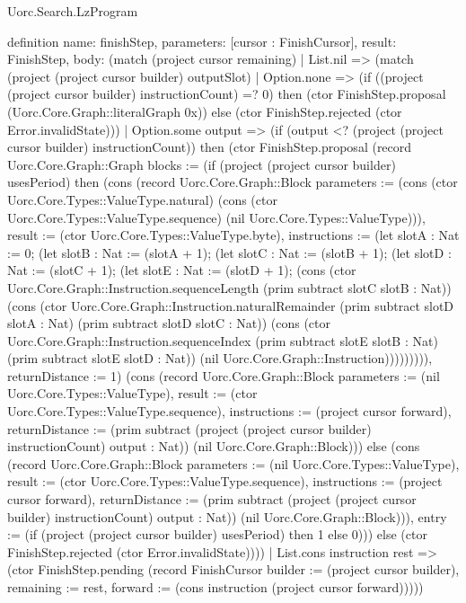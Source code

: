\begin{lexlean}{Uorc.Search.LzProgram}
\begin{semanticmodule}
definition{
  name: finishStep,
  parameters: [cursor : FinishCursor],
  result: FinishStep,
  body: (match (project cursor remaining)
    | List.nil => (match (project (project cursor builder) outputSlot)
      | Option.none => (if ((project (project cursor builder) instructionCount) =? 0) then (ctor FinishStep.proposal (Uorc.Core.Graph::literalGraph 0x)) else (ctor FinishStep.rejected (ctor Error.invalidState)))
      | Option.some output => (if (output <? (project (project cursor builder) instructionCount)) then (ctor FinishStep.proposal (record Uorc.Core.Graph::Graph {blocks := (if (project (project cursor builder) usesPeriod) then (cons (record Uorc.Core.Graph::Block {parameters := (cons (ctor Uorc.Core.Types::ValueType.natural) (cons (ctor Uorc.Core.Types::ValueType.sequence) (nil Uorc.Core.Types::ValueType))), result := (ctor Uorc.Core.Types::ValueType.byte), instructions := (let slotA : Nat := 0; (let slotB : Nat := (slotA + 1); (let slotC : Nat := (slotB + 1); (let slotD : Nat := (slotC + 1); (let slotE : Nat := (slotD + 1); (cons (ctor Uorc.Core.Graph::Instruction.sequenceLength (prim subtract slotC slotB : Nat)) (cons (ctor Uorc.Core.Graph::Instruction.naturalRemainder (prim subtract slotD slotA : Nat) (prim subtract slotD slotC : Nat)) (cons (ctor Uorc.Core.Graph::Instruction.sequenceIndex (prim subtract slotE slotB : Nat) (prim subtract slotE slotD : Nat)) (nil Uorc.Core.Graph::Instruction))))))))), returnDistance := 1}) (cons (record Uorc.Core.Graph::Block {parameters := (nil Uorc.Core.Types::ValueType), result := (ctor Uorc.Core.Types::ValueType.sequence), instructions := (project cursor forward), returnDistance := (prim subtract (project (project cursor builder) instructionCount) output : Nat)}) (nil Uorc.Core.Graph::Block))) else (cons (record Uorc.Core.Graph::Block {parameters := (nil Uorc.Core.Types::ValueType), result := (ctor Uorc.Core.Types::ValueType.sequence), instructions := (project cursor forward), returnDistance := (prim subtract (project (project cursor builder) instructionCount) output : Nat)}) (nil Uorc.Core.Graph::Block))), entry := (if (project (project cursor builder) usesPeriod) then 1 else 0)})) else (ctor FinishStep.rejected (ctor Error.invalidState))))
    | List.cons instruction rest => (ctor FinishStep.pending (record FinishCursor {builder := (project cursor builder), remaining := rest, forward := (cons instruction (project cursor forward))})))
}
\end{semanticmodule}
\end{lexlean}
